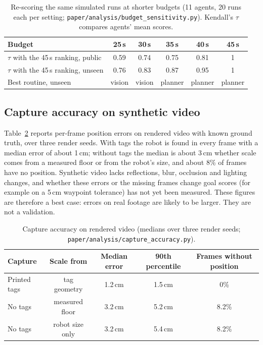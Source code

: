 \documentclass[11pt]{article}
\begin{document}
\begin{table}[t]
\centering\small
\begin{tabular}{@{}lccccc@{}}
\toprule
Budget & 25\,s & 30\,s & 35\,s & 40\,s & 45\,s \\
\midrule
$\tau$ with the 45\,s ranking, public & 0.59 & 0.74 & 0.75 & 0.81 & 1 \\
$\tau$ with the 45\,s ranking, unseen & 0.76 & 0.83 & 0.87 & 0.95 & 1 \\
Best routine, unseen & vision & vision & planner & planner & planner \\
\bottomrule
\end{tabular}
\caption{Re-scoring the same simulated runs at shorter budgets (11 agents, 20 runs each per setting;
\texttt{paper/analysis/budget\_sensitivity.py}). Kendall's $\tau$ compares agents' mean scores.}
\label{tab:budget}
\end{table}

\subsection{Capture accuracy on synthetic video}

Table~\ref{tab:capture} reports per-frame position errors on rendered video with known ground truth,
over three render seeds. With tags the robot is found in every frame with a median error of about
1\,cm; without tags the median is about 3\,cm whether scale comes from a measured floor or from the
robot's size, and about 8\% of frames have no position. Synthetic video lacks reflections, blur,
occlusion and lighting changes, and whether these errors or the missing frames change goal scores
(for example on a 5\,cm waypoint tolerance) has not yet been measured. These figures are therefore a
best case: errors on real footage are likely to be larger. They are not a validation.

\begin{table}[t]
\centering\small
\begin{tabular}{@{}lcccc@{}}
\toprule
Capture & Scale from & Median error & 90th percentile & Frames without position \\
\midrule
Printed tags & tag geometry & 1.2\,cm & 1.5\,cm & 0\% \\
No tags & measured floor & 3.2\,cm & 5.2\,cm & 8.2\% \\
No tags & robot size only & 3.2\,cm & 5.4\,cm & 8.2\% \\
\bottomrule
\end{tabular}
\caption{Capture accuracy on rendered video (medians over three render seeds;
\texttt{paper/analysis/capture\_accuracy.py}).}
\label{tab:capture}
\end{table}
\end{document}
